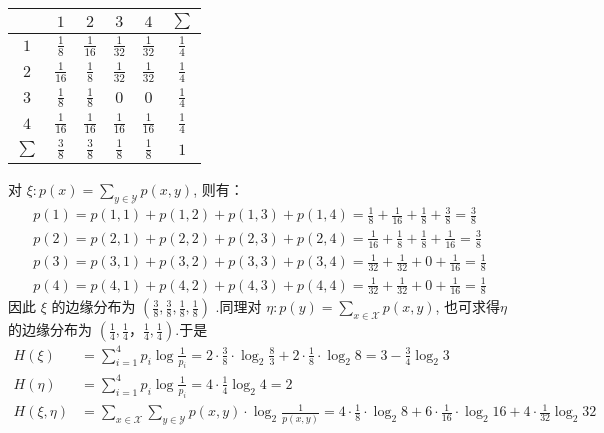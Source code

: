 \begin{tcolorbox}[breakable,colback=blue!5!white,colframe=blue!75!black,
 title= 解答题]
\begin{center}
\begin{tabular}{|c|cccc|c|}
\hline
\diagbox{$ \eta $}{$ \xi $}
 & $1$ & $2$ & $3$ & $4$ & $ \sum $ \\
\hline $1$ & $ \frac{1}{8} $ & $ \frac{1}{16} $ & $ \frac{1}{32} $ & $ \frac{1}{32} $ & $ \frac{1}{4} $ \\
$2$ & $ \frac{1}{16} $ & $ \frac{1}{8} $ & $ \frac{1}{32} $ & $ \frac{1}{32} $ & $ \frac{1}{4} $ \\
$3$ & $ \frac{1}{8} $ & $ \frac{1}{8} $ & $ 0 $ & $ 0 $ & $ \frac{1}{4} $ \\
$4$ & $ \frac{1}{16} $ & $ \frac{1}{16}$ & $ \frac{1}{16}$ & $ \frac{1}{16}$ & $ \frac{1}{4} $ \\
\hline $\sum$ & $\frac{3}{8}$ & $\frac{3}{8}$ & $\frac{1}{8}$ & $\frac{1}{8}$ & $1 $ \\
\hline
\end{tabular}
\end{center}
对  $\xi: p(x)=\sum\limits_{y \in \mathscr{Y}} p(x, y)$, 则有：
$$
\begin{array}{l} 
p(1)=p(1,1)+p(1,2)+p(1,3)+p(1,4) 
=\frac{1}{8}+\frac{1}{16}+\frac{1}{8}+\frac{3}{8}=\frac{3}{8} \\
p(2)=p(2,1)+p(2,2)+p(2,3)+p(2,4) 
=\frac{1}{16}+\frac{1}{8}+\frac{1}{8}+\frac{1}{16}=\frac{3}{8} \\
p(3)=p(3,1)+p(3,2)+p(3,3)+p(3,4) 
=\frac{1}{32}+\frac{1}{32}+0+\frac{1}{16}=\frac{1}{8} \\
p(4)=p(4,1)+p(4,2)+p(4,3)+p(4,4) 
=\frac{1}{32}+\frac{1}{32}+0+\frac{1}{16}=\frac{1}{8}
\end{array}
$$
因此 $ \xi $ 的边缘分布为 $ \left(\frac{3}{8}, \frac{3}{8}, \frac{1}{8}, \frac{1}{8}\right) $ .同理对 $\eta: p(y)=\sum\limits_{x \in \mathscr{X}} p(x, y)$,
也可求得$\eta$的边缘分布为 $ \left(\frac{1}{4}, \frac{1}{4} ， \frac{1}{4}, \frac{1}{4}\right) $.于是
$$\begin{aligned}
     H(\xi)&=\sum_{i=1}^{4} p_{i} \log \frac{1}{p_{i}}=2 \cdot \frac{3}{8} \cdot \log _{2} \frac{8}{3}+2 \cdot \frac{1}{8} \cdot \log _{2} 8 =3-\frac{3}{4} \log _{2} 3 \\
H(\eta)&=\sum_{i=1}^{4} p_{i} \log \frac{1}{p_{i}}=4 \cdot \frac{1}{4} \log _{2} 4=2 \\
H(\xi, \eta)&=\sum_{x \in \mathscr{X}} \sum_{y \in \mathscr{Y}} p(x, y) \cdot \log _{2} \frac{1}{p(x, y)} 
=4 \cdot \frac{1}{8} \cdot \log _{2} 8+6 \cdot \frac{1}{16} \cdot \log _{2} 16+4 \cdot \frac{1}{32} \log _{2} 32 \\

\end{aligned}$$
\end{tcolorbox}
